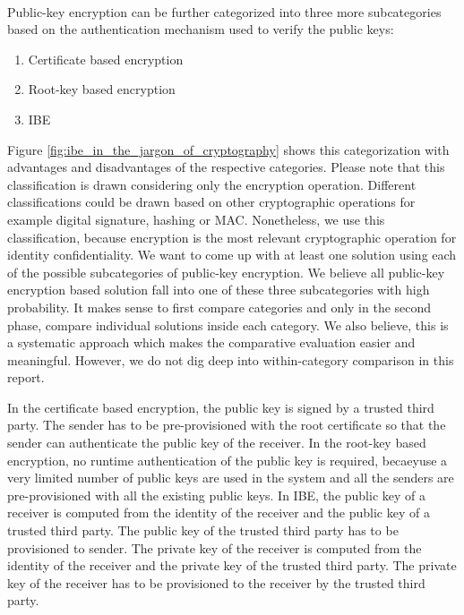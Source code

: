 \documentclass[runningheads,a4paper]{llncs} %
\begin{document}
\paragraph{}
Public-key encryption can be further categorized into three more subcategories based on the authentication mechanism used to verify the public keys:
\begin{enumerate}
\item Certificate based encryption
\item Root-key based encryption
\item IBE
\end{enumerate} 
Figure \ref{fig:ibe_in_the_jargon_of_cryptography} shows this categorization with advantages and disadvantages of the respective categories. Please note that this classification is drawn considering only the encryption operation. Different classifications could be drawn based on other cryptographic operations for example digital signature, hashing or MAC. Nonetheless, we use this classification, because encryption is the most relevant cryptographic operation for identity confidentiality. We want to come up with at least one solution using each of the possible subcategories of public-key encryption. We believe all public-key encryption based solution fall into one of these three subcategories with high probability. It makes sense to first compare categories and only in the second phase, compare individual solutions inside each category. We also believe, this is a systematic approach which makes the comparative evaluation easier and meaningful.
However, we do not dig deep into within-category comparison in this report.

In the certificate based encryption, the public key is signed by a trusted third party. The sender has to be pre-provisioned with the root certificate so that the sender can authenticate the public key of the receiver. In the root-key based encryption, no runtime authentication of the public key is required, becaeyuse a very limited number of public keys are used in the system and all the senders are pre-provisioned with all the existing public keys. In IBE, the public key of a receiver is computed from the identity of the receiver and the public key of a trusted third party. The public key of the trusted third party has to be provisioned to sender. The private key of the receiver is computed from the identity of the receiver and the private key of the trusted third party. The private key of the receiver has to be provisioned to the receiver by the trusted third party.
\end{document}

